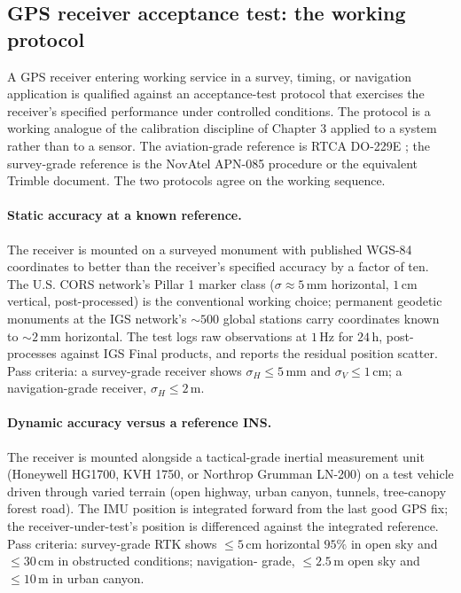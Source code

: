 \subsection{GPS receiver acceptance test: the working
protocol}

A GPS receiver entering working service in a survey, timing, or
navigation application is qualified against an acceptance-test
protocol that exercises the receiver's specified performance under
controlled conditions. The protocol is a working analogue of the
calibration discipline of Chapter 3 applied to a system rather
than to a sensor. The aviation-grade reference is RTCA DO-229E
\cite{std:ch06t3b-rtca-do229e-2016}; the survey-grade reference is
the NovAtel APN-085 procedure
\cite{web:ch06t3b-novatel-receiver-test-2023} or the equivalent
Trimble document. The two protocols agree on the working sequence.

\paragraph{Static accuracy at a known reference.} The receiver is
mounted on a surveyed monument with published WGS-84 coordinates
to better than the receiver's specified accuracy by a factor of
ten. The U.S. CORS network's Pillar 1 marker class
($\sigma \approx 5 \,\si{\milli\meter}$ horizontal, $1 \,\si{\centi
\meter}$ vertical, post-processed) is the conventional working
choice; permanent geodetic monuments at the IGS network's $\sim 500$
global stations carry coordinates known to $\sim 2 \,\si{\milli
\meter}$ horizontal. The test logs raw observations at
$1 \,\si{\hertz}$ for $24 \,\si{\hour}$, post-processes against
IGS Final products, and reports the residual position scatter.
Pass criteria: a survey-grade receiver shows
$\sigma_{H} \leq 5 \,\si{\milli\meter}$ and $\sigma_{V} \leq 1 \,\si
{\centi\meter}$; a navigation-grade receiver, $\sigma_{H} \leq 2 \,\si
{\meter}$.

\paragraph{Dynamic accuracy versus a reference INS.} The receiver
is mounted alongside a tactical-grade inertial measurement unit
(Honeywell HG1700, KVH 1750, or Northrop Grumman LN-200) on a test
vehicle driven through varied terrain (open highway, urban canyon,
tunnels, tree-canopy forest road). The IMU position is integrated
forward from the last good GPS fix; the receiver-under-test's
position is differenced against the integrated reference. Pass
criteria: survey-grade RTK shows
$\leq 5 \,\si{\centi\meter}$ horizontal $95\%$ in open sky and
$\leq 30 \,\si{\centi\meter}$ in obstructed conditions; navigation-
grade, $\leq 2.5 \,\si{\meter}$ open sky and $\leq 10 \,\si{\meter}$
in urban canyon.


